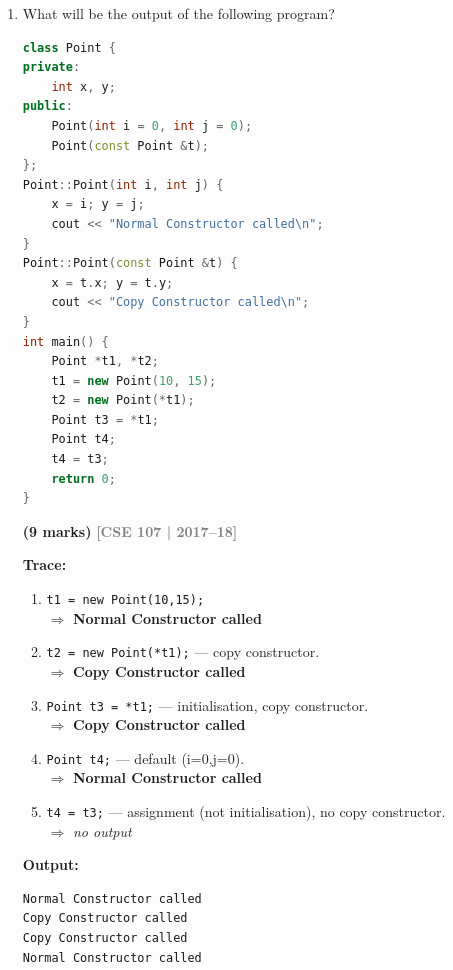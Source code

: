 \documentclass[12pt,a3paper]{article}
\newcommand{\yr}[1]{\hfill\textcolor{gray}{\small\textbf{[#1]}}}
\newcommand{\mk}[1]{\textcolor{orange!70!black}{\small\textbf{(#1 marks)}}}
\begin{document}
\begin{enumerate}
\begin{tcolorbox}
\end{tcolorbox}

\item What will be the output of the following program?
\begin{lstlisting}[language=C++]
class Point {
private:
    int x, y;
public:
    Point(int i = 0, int j = 0);
    Point(const Point &t);
};
Point::Point(int i, int j) {
    x = i; y = j;
    cout << "Normal Constructor called\n";
}
Point::Point(const Point &t) {
    x = t.x; y = t.y;
    cout << "Copy Constructor called\n";
}
int main() {
    Point *t1, *t2;
    t1 = new Point(10, 15);
    t2 = new Point(*t1);
    Point t3 = *t1;
    Point t4;
    t4 = t3;
    return 0;
}
\end{lstlisting}
\mk{9}
\yr{CSE 107 | 2017--18}


\begin{tcolorbox}[enhanced,breakable,ansbox,colback=cE!4,colframe=cE,
  boxrule=0.8pt,arc=5pt,
  title={\textbf{Answer --- Output of Point program}},
  fonttitle=\bfseries\color{white},colbacktitle=cE]

\textbf{Trace:}
\begin{enumerate}[label=\textbf{\arabic*:}]
  \item \texttt{t1 = new Point(10,15);} \\$\Rightarrow$ \textbf{Normal Constructor called}
  \item \texttt{t2 = new Point(*t1);} --- copy constructor.\\ $\Rightarrow$ \textbf{Copy Constructor called}
  \item \texttt{Point t3 = *t1;} --- initialisation, copy constructor. \\$\Rightarrow$ \textbf{Copy Constructor called}
  \item \texttt{Point t4;} --- default (i=0,j=0). \\$\Rightarrow$ \textbf{Normal Constructor called}
  \item \texttt{t4 = t3;} --- assignment (not initialisation), no copy constructor.\\ $\Rightarrow$ \textit{no output}
\end{enumerate}

\textbf{Output:}
\begin{lstlisting}
Normal Constructor called
Copy Constructor called
Copy Constructor called
Normal Constructor called
\end{lstlisting}


\end{tcolorbox}
\end{enumerate}
\end{document}
